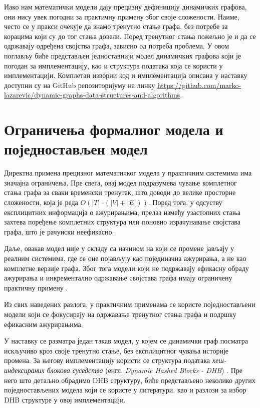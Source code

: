 
Иако нам математички модели дају прецизну дефиницију динамичких графова, они нису увек погодни за практичну примену због своје сложености. Наиме, често се у пракси очекује да знамо тренутно стање графа, без потребе за корацима који су до тог стања довели. Поред тренутног стања пожељно је и да се одржавају одређена својства графа, зависно од потреба проблема. У овом поглављу биће представљен једноставнији модел динамичких графова који је погодан за имплементацију, као и структура података која се користи у имплементацији. Комплетан изворни код и имплементација описана у наставку доступни су на GitHub репозиторијуму на линку \url{https://github.com/marko-lazarevic/dynamic-graphs-data-structures-and-algorithms}.

\section{Ограничења формалног модела и поједностављен модел}

Директна примена прецизног математичког модела у практичним системима има значајна ограничења. Пре свега, овај модел подразумева чување комплетног стања графа за сваки временски тренутак, што доводи до велике просторне сложености, која је реда $O(|T| \cdot (|V| + |E|))$. Поред тога, у одсуству експлицитних информација о ажурирањима, прелаз између узастопних стања захтева поређење комплетних структура или поновно израчунавање својстава графа, што је рачунски неефикасно.

Даље, овакав модел није у складу са начином на који се промене јављају у реалним системима, где се оне појављују као појединачна ажурирања, а не као комплетне верзије графа. Због тога модели који не подржавају ефикасну обраду ажурирања и инкрементално одржавање својстава графа имају ограничену практичну примену \cite{islam2024dgapefficientdynamicgraph}.

Из свих наведених разлога, у практичним применама се користе поједностављени модели који се фокусирају на одржавање тренутног стања графа и подршку ефикасним ажурирањима.

У наставку се разматра један такав модел, у којем се динамички граф посматра искључиво кроз своје тренутно стање, без експлицитног чувања историје промена. За његову имплементацију користи се структура података \emph{хеш-индексираних блокова суседства} (енгл. \textit{Dynamic Hashed Blocks - DHB}) \cite{vandergrinten_et_al:LIPIcs.SEA.2022.11}. Пре него што детаљно обрадимо DHB структуру, биће представљено неколико других поједностављених модела који се користе у литератури, као и разлози за избор DHB структуре у овој имплементацији.

